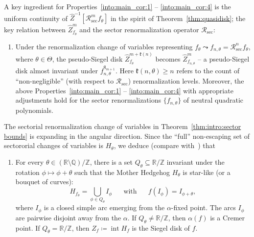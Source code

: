 \documentclass{amsart}
\renewcommand{\sp}{{\ \ }}
\newcommand{\1}{{\mathbb 1 }}
\newcommand\RR{\mathcal{R}}
\newcommand\intr{\operatorname{int}}
\newcommand{\wZ}{{\widehat Z}}
\newcommand{\qq}{\mathfrak{q}}
\newcommand{\kk}{\mathfrak{k}}
\newcommand{\Q}{\mathbb{Q}}
\newcommand{\R}{\mathbb{R}}
\newcommand{\Z}{\mathbb{Z}}
\theoremstyle{remark}
\numberwithin{equation}{section}
\theoremstyle{definition}
\renewcommand{\sec}{\mathrm{sec}}
\begin{document}
A key ingredient for Properties~\ref{into:main_cor:1} -- \ref{into:main_cor:4} is the uniform continuity of $\wZ^{-1}[\RR^m_\sec f_\theta]$ in the spirit of Theorem~\ref{thm:quasidisk}; the key relation between $\wZ^m_{f_\theta}$ and the sector renormalization operator $\RR_\sec$:
\begin{enumerate}[label=\text{(\Roman*)},font=\normalfont,leftmargin=*,start=5]
\item \label{into:main_cor:5}  Under the renormalization change of variables representing $f_\theta \leadsto f_{n,\theta}=\RR^n_\sec f_\theta$, where $\theta\in \Theta$, the pseudo-Siegel disk $\wZ^{m+\kk(n)}_{f_\theta}$ becomes $\wZ^{m}_{f_{n,\theta}}$ -- a pseudo-Siegel disk almost invariant under $f_{n,\theta}^{\qq_{m+1}}$. Here $\kk(n,\theta)\ge n$ refers to the count of ``non-negligible'' (with respect to $\RR_\sec$) renormalization levels. Moreover, the above Properties~\ref{into:main_cor:1} -- \ref{into:main_cor:4} with appropriate adjustments hold for the sector renormalizations $\{f_{n,\theta}\}$ of neutral quadratic polynomials.
\end{enumerate}
  
  
 







 

The sectorial renormalization change of variables in Theorem~\ref{thm:intro:sector bounds} is expanding in the angular direction. Since the ``full'' non-escaping set of sectororial changes of variables is $H_\theta$, we deduce (compare with~\cite{RRRS}) that

\begin{enumerate}[label=\text{(\Roman*)},font=\normalfont,leftmargin=*,start=6]
\item \label{into:main_cor:6} For every $\theta\in{ (\R\setminus \Q)/\Z}$, there is a set $Q_\theta\subseteq \R/\Z$ invariant under the rotation $\phi \mapsto \phi+\theta$ such that the Mother Hedgehog $H_{\theta}$ is star-like (or a bouquet of curves): \[H_{f_\theta}= \bigcup_{\phi\in Q_\theta} I_\phi\sp\sp\sp \text{ with }\sp \sp\sp f(I_\phi)=I_{\phi+\theta},\] where $I_\phi$ is a closed simple arc emerging from the $\alpha$-fixed point. The arcs $I_\phi$ are pairwise disjoint away from the $\alpha$. If $Q_\theta\not= \R/\Z$, then $\alpha(f)$ is a Cremer point. If $Q_\theta=\R/\Z$, then $Z_f\coloneqq\intr H_f$ is the Siegel disk of $f$.
\end{enumerate}
\end{document}

